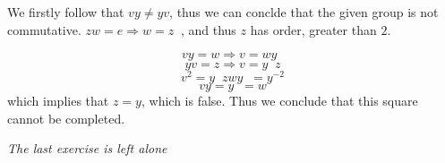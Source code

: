 \documentclass[11pt,oneside,titlepage]{book}
\DeclareMathOperator \inv {^{-1}}
\DeclareMathOperator \ra {\Rightarrow}
\begin{document}
We firstly follow that $vy \neq yv$, thus we can conclde that the given group is not commutative.
$zw = e \ra w = z\inv$, and thus $z$ has order, greater than $2$.

$$vy = w \ra v = wy\inv$$
$$yv = z \ra v = y\inv z$$
$$v^2 = y\inv z w y\inv = y^{-2}$$
$$vy = y\inv = w$$
which implies that $z = y$, which is false. Thus we conclude that this square cannot be completed.

\textit{The last exercise is left alone}
\end{document}
